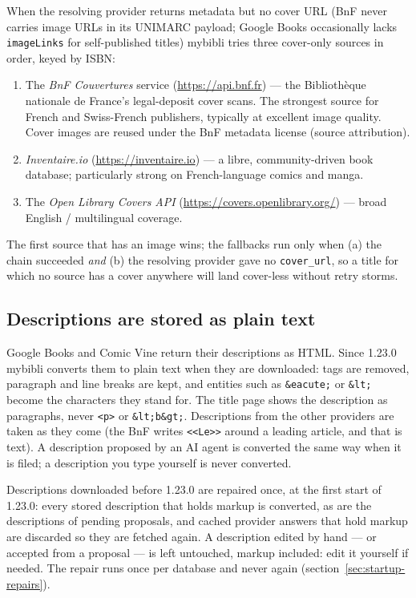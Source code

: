When the resolving provider returns metadata but no cover URL
(BnF never carries image URLs in its UNIMARC payload; Google Books
occasionally lacks \texttt{imageLinks} for self-published titles)
mybibli tries three cover-only sources in order, keyed by ISBN:

\begin{enumerate}
  \item The \emph{BnF Couvertures} service (\url{https://api.bnf.fr})
        — the Biblioth\`eque nationale de France's legal-deposit
        cover scans. The strongest source for French and Swiss-French
        publishers, typically at excellent image quality. Cover
        images are reused under the BnF metadata license (source
        attribution).
  \item \emph{Inventaire.io} (\url{https://inventaire.io}) — a
        libre, community-driven book database; particularly strong
        on French-language comics and manga.
  \item The \emph{Open Library Covers API}
        (\url{https://covers.openlibrary.org/}) — broad English /
        multilingual coverage.
\end{enumerate}

The first source that has an image wins; the fallbacks run only
when (a) the chain succeeded \emph{and} (b) the resolving provider
gave no \texttt{cover\_url}, so a title for which no source has a
cover anywhere will land cover-less without retry storms.

\subsection*{Descriptions are stored as plain text}

Google Books and Comic Vine return their descriptions as HTML. Since
1.23.0 mybibli converts them to plain text when they are downloaded:
tags are removed, paragraph and line breaks are kept, and entities
such as \texttt{\&eacute;} or \texttt{\&lt;} become the characters
they stand for. The title page shows the description as paragraphs,
never \texttt{<p>} or \texttt{\&lt;b\&gt;}. Descriptions from the
other providers are taken as they come (the BnF writes
\texttt{<<Le>>} around a leading article, and that is text). A
description proposed by an AI agent is converted the same way when it
is filed; a description you type yourself is never converted.

Descriptions downloaded before 1.23.0 are repaired once, at the first
start of 1.23.0: every stored description that holds markup is
converted, as are the descriptions of pending proposals, and cached
provider answers that hold markup are discarded so they are fetched
again. A description edited by hand --- or accepted from a proposal ---
is left untouched, markup included: edit it yourself if needed. The
repair runs once per database and never again
(section~\ref{sec:startup-repairs}).

